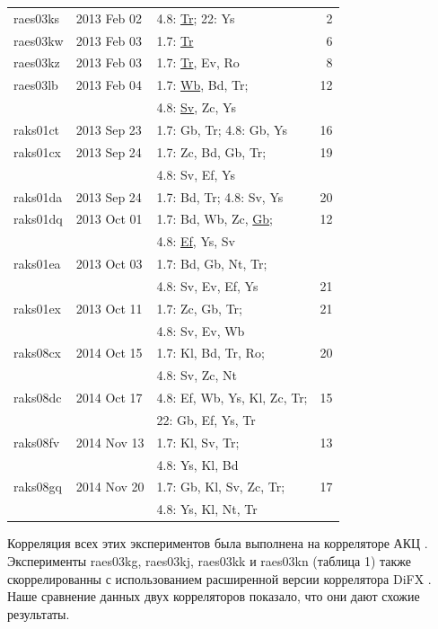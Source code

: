 \begin{table}[tbh]
\begin{SingleSpace}
\begin{tabular}{lllr}
raes03ks & 2013 Feb 02 & 4.8: \underline{Tr}; 22: Ys & 2 \\
raes03kw & 2013 Feb 03 & 1.7: \underline{Tr} & 6 \\
raes03kz & 2013 Feb 03 & 1.7: \underline{Tr}, Ev, Ro & 8 \\
raes03lb & 2013 Feb 04 & 1.7: \underline{Wb}, Bd, Tr; & 12 \\
         &             & 4.8: \underline{Sv}, Zc, Ys &  \\
raks01ct & 2013 Sep 23 & 1.7: Gb, Tr; 4.8: Gb, Ys & 16 \\
raks01cx & 2013 Sep 24 & 1.7: Zc, Bd, Gb, Tr;& 19  \\
         &             & 4.8: Sv, Ef, Ys  & \\
raks01da & 2013 Sep 24 & 1.7: Bd, Tr; 4.8: Sv, Ys & 20  \\
raks01dq & 2013 Oct 01 & 1.7: Bd, Wb, Zc, \underline{Gb}; & 12 \\
         &             & 4.8: \underline{Ef}, Ys, Sv &  \\
raks01ea & 2013 Oct 03 & 1.7: Bd, Gb, Nt, Tr;   \\
         &             & 4.8: Sv, Ev, Ef, Ys & 21 \\
raks01ex & 2013 Oct 11 & 1.7: Zc, Gb, Tr; & 21  \\
         &             & 4.8: Sv, Ev, Wb  & \\
raks08cx & 2014 Oct 15 & 1.7: Kl, Bd, Tr, Ro; & 20  \\
         &             & 4.8: Sv, Zc, Nt  & \\
raks08dc & 2014 Oct 17 & 4.8: Ef, Wb, Ys, Kl, Zc, Tr; & 15  \\
         &             &  22: Gb, Ef, Ys, Tr  & \\
raks08fv & 2014 Nov 13 & 1.7: Kl, Sv, Tr; & 13  \\
         &             & 4.8: Ys, Kl, Bd  & \\
raks08gq & 2014 Nov 20 & 1.7: Gb, Kl, Sv, Zc, Tr; & 17  \\
         &             & 4.8: Ys, Kl, Nt, Tr & \\
\bottomrule
\end{tabular}
\end{SingleSpace}
\end{table}

Корреляция всех этих экспериментов была выполнена на корреляторе АКЦ \cite{Likhachev_2017}.
Эксперименты raes03kg, raes03kj, raes03kk и raes03kn (таблица 1) также скоррелированны с
использованием расширенной версии \cite{Bruni_2016} коррелятора DiFX \cite{Deller_2011}. Наше
сравнение данных двух корреляторов показало, что они дают схожие результаты.

